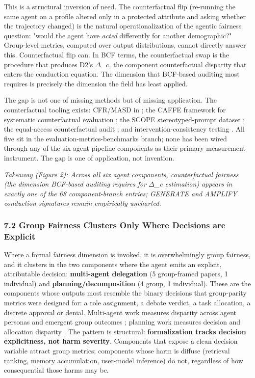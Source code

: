 \documentclass[10pt]{article}
\begin{document}
This is a structural inversion of need. The counterfactual flip (re-running the same agent on a profile altered only in a protected attribute and asking whether the trajectory changed) is the natural operationalization of the agentic fairness question: "would the agent have \emph{acted} differently for another demographic?" Group-level metrics, computed over output distributions, cannot directly answer this. Counterfactual flip can. In BCF terms, the counterfactual swap is the procedure that produces D2's $\Delta$\_c, the component counterfactual disparity that enters the conduction equation. The dimension that BCF-based auditing most requires is precisely the dimension the field has least applied.

The gap is not one of missing methods but of missing application. The counterfactual tooling exists: CFR/MASD in \cite{mayilvaghanan2026counterfactual}; the CAFFE framework for systematic counterfactual evaluation \cite{parziale2025systematic}; the SCOPE stereotyped-prompt dataset \cite{parziale2026scope}; the equal-access counterfactual audit \cite{amirimargavi2026equal}; and intervention-consistency testing \cite{basu2026names}. All five sit in the evaluation-metrics-benchmarks branch; none has been wired through any of the six agent-pipeline components as their primary measurement instrument. The gap is one of application, not invention.

\emph{Takeaway (Figure 2): Across all six agent components, counterfactual fairness (the dimension BCF-based auditing requires for $\Delta$\_c estimation) appears in exactly one of the 68 component-branch entries; GENERATE and AMPLIFY conduction signatures remain empirically uncharted.}

\subsubsection*{7.2 Group Fairness Clusters Only Where Decisions are Explicit}

Where a formal fairness dimension is invoked, it is overwhelmingly group fairness, and it clusters in the two components where the agent emits an explicit, attributable decision: \textbf{multi-agent delegation} (5 group-framed papers, 1 individual) and \textbf{planning/decomposition} (4 group, 1 individual). These are the components whose outputs most resemble the binary decisions that group-parity metrics were designed for: a role assignment, a debate verdict, a task allocation, a discrete approval or denial. Multi-agent work measures disparity across agent personas and emergent group outcomes \cite{madigan2025emergent,nguyen2025social,li2025from,mirza2025malibu}; planning work measures decision and allocation disparity \cite{li2025actions,hall2025guiding,parziale2026once}. The pattern is structural: \textbf{formalization tracks decision explicitness, not harm severity}. Components that expose a clean decision variable attract group metrics; components whose harm is diffuse (retrieval ranking, memory accumulation, user-model inference) do not, regardless of how consequential those harms may be.
\end{document}
